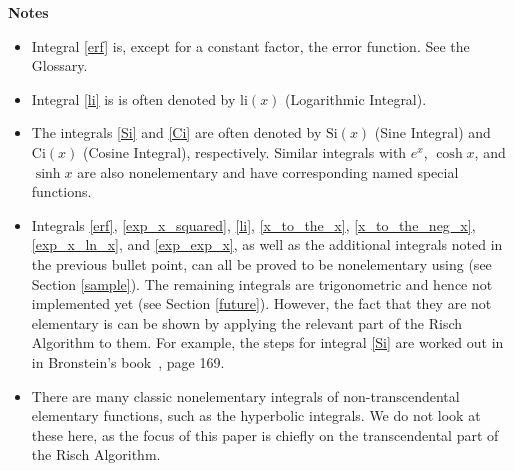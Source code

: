 \textbf{Notes}
\begin{itemize}
\item Integral \ref{erf} is, except for a constant factor, the
\gls{error function}.  See the Glossary.
\item Integral \ref{li} is is often denoted by $\mathrm{li}(x)$
(Logarithmic Integral).
\item The integrals \ref{Si} and \ref{Ci} are often denoted by
$\mathrm{Si}(x)$ (Sine Integral) and $\mathrm{Ci}(x)$ (Cosine Integral),
respectively.  Similar integrals with $e^x$, $\cosh{x}$, and $\sinh{x}$
are also nonelementary and have corresponding named special functions.

\item Integrals \ref{erf}, \ref{exp_x_squared}, \ref{li},
\ref{x_to_the_x}, \ref{x_to_the_neg_x}, \ref{exp_x_ln_x}, and
\ref{exp_exp_x}, as well as the additional integrals noted in the
previous bullet point, can all be proved to be nonelementary using
\rischintegrate{} (see Section \ref{sample}). The remaining integrals
are trigonometric and hence not implemented yet (see Section
\ref{future}).  However, the fact that they are not \gls{elementary} is
can be shown by applying the relevant part of the Risch Algorithm to
them. For example, the steps  for integral \ref{Si} are worked out in in
Bronstein's book~\cite{bronstein2005symbolic}, page 169.

\item There are many classic nonelementary integrals of
non-\gls{transcendental} \gls{elementary} functions, such as the hyperbolic
integrals.  We do not look at these here, as the focus of this paper is
chiefly on the \gls{transcendental} part of the Risch Algorithm.
\end{itemize}